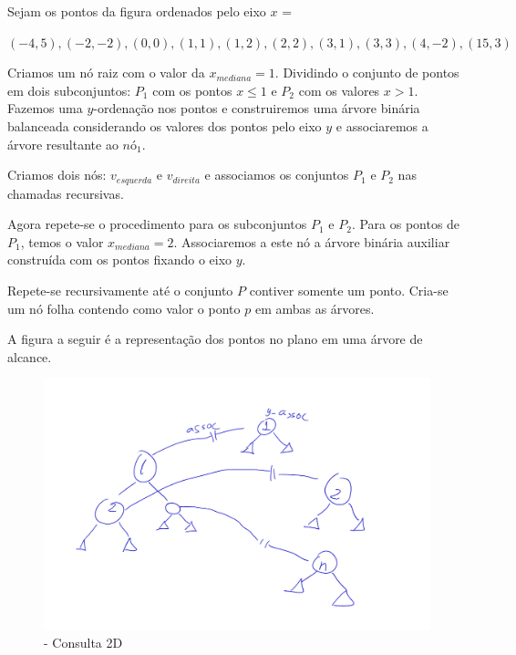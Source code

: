 
Sejam os pontos da figura ordenados pelo eixo $x$ =

$(-4, 5),(-2,-2),(0,0),(1,1),(1,2),(2,2), (3,1),(3,3),(4,-2),(15,3)$

Criamos um nó raiz com o valor da $x_{mediana} = 1$. Dividindo o conjunto de pontos em dois subconjuntos:
$P_1$ com os pontos $x\leq 1$ e $P_2$ com os valores $x > 1$.
Fazemos uma $y$-ordenação nos pontos e construiremos uma árvore binária balanceada considerando os 
valores dos pontos pelo eixo $y$ e associaremos a árvore resultante ao $nó_1$.


Criamos dois nós: $v_{esquerda}$ e $v_{direita}$ e associamos os conjuntos $P_1$ e $P_2$ nas chamadas
recursivas.

Agora repete-se o procedimento para os subconjuntos $P_1$ e $P_2$.
Para os pontos de $P_1$, temos o valor $x_{mediana} = 2$. Associaremos a este nó a árvore binária auxiliar
construída com os pontos fixando o eixo $y$.

Repete-se recursivamente  até o conjunto $P$ contiver somente um ponto.
Cria-se um nó folha contendo como valor o ponto $p$ em ambas as árvores.

A figura a seguir é a representação dos pontos no plano em uma árvore de alcance.

\begin{figure}[htb]
    \caption{\label{fig:Fig_16} - Consulta 2D}
    \begin{center}
        \includegraphics[width=\textwidth]{images/range_assoc2.pdf}
    \end{center}
\end{figure}

